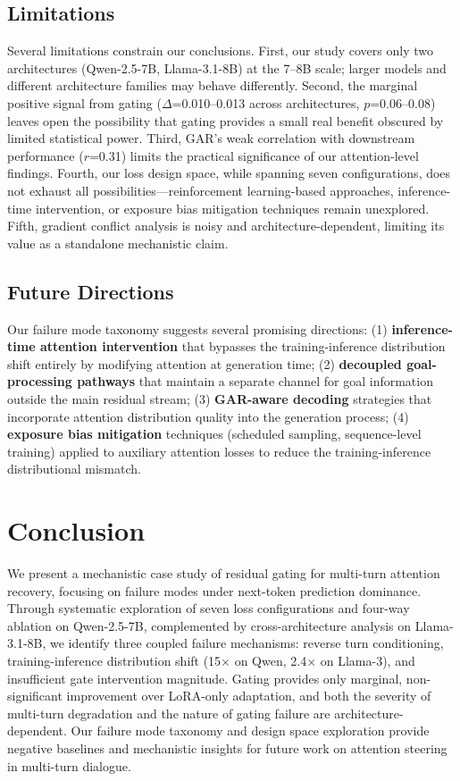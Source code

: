 \documentclass[11pt,a4paper]{article}
\begin{document}
\subsection{Limitations}

Several limitations constrain our conclusions. First, our study covers only two architectures (Qwen-2.5-7B, Llama-3.1-8B) at the 7--8B scale; larger models and different architecture families may behave differently. Second, the marginal positive signal from gating ($\Delta$=0.010--0.013 across architectures, $p$=0.06--0.08) leaves open the possibility that gating provides a small real benefit obscured by limited statistical power. Third, GAR's weak correlation with downstream performance ($r$=0.31) limits the practical significance of our attention-level findings. Fourth, our loss design space, while spanning seven configurations, does not exhaust all possibilities---reinforcement learning-based approaches, inference-time intervention, or exposure bias mitigation techniques remain unexplored. Fifth, gradient conflict analysis is noisy and architecture-dependent, limiting its value as a standalone mechanistic claim.

\subsection{Future Directions}

Our failure mode taxonomy suggests several promising directions: (1) \textbf{inference-time attention intervention} that bypasses the training-inference distribution shift entirely by modifying attention at generation time; (2) \textbf{decoupled goal-processing pathways} that maintain a separate channel for goal information outside the main residual stream; (3) \textbf{GAR-aware decoding} strategies that incorporate attention distribution quality into the generation process; (4) \textbf{exposure bias mitigation} techniques (scheduled sampling, sequence-level training) applied to auxiliary attention losses to reduce the training-inference distributional mismatch.

\section{Conclusion}

We present a mechanistic case study of residual gating for multi-turn attention recovery, focusing on failure modes under next-token prediction dominance. Through systematic exploration of seven loss configurations and four-way ablation on Qwen-2.5-7B, complemented by cross-architecture analysis on Llama-3.1-8B, we identify three coupled failure mechanisms: reverse turn conditioning, training-inference distribution shift (15$\times$ on Qwen, 2.4$\times$ on Llama-3), and insufficient gate intervention magnitude. Gating provides only marginal, non-significant improvement over LoRA-only adaptation, and both the severity of multi-turn degradation and the nature of gating failure are architecture-dependent. Our failure mode taxonomy and design space exploration provide negative baselines and mechanistic insights for future work on attention steering in multi-turn dialogue.
\end{document}
